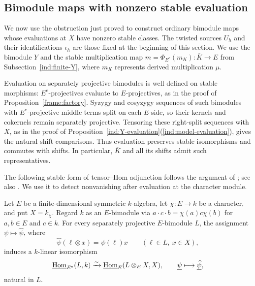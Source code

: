 \documentclass[11pt]{article}
\begin{document}
\subsection{Bimodule maps with nonzero stable evaluation}
\label{lift:nonzero-section}

We now use the obstruction just proved to construct ordinary bimodule maps
whose evaluations at $X$ have nonzero stable classes. The twisted
sources $U_h$ and their identifications $\iota_h$ are those fixed
at the beginning of this section.
We use the bimodule $Y$ and the stable multiplication map
$m=\Phi_{E^e}(m_K):\overline K\to E$ from
Subsection~\ref{ind:finite-Y}, where $m_K$ represents derived
multiplication $\mu$.

Evaluation on separately projective bimodules is well defined
on stable morphisms: $E^e$-projectives evaluate to $E$-projectives,
as in the proof of Proposition~\ref{frame:factory}.
Syzygy and cosyzygy sequences of such bimodules with
$E^e$-projective middle terms split on each $E$-side, so their kernels and cokernels remain
separately projective. Tensoring these right-split sequences with
$X$, as in the proof of Proposition~\ref{ind:Y-evaluation}\textup{(\ref{ind:model-evaluation})},
gives the natural shift comparisons. Thus evaluation preserves
stable isomorphisms and commutes with shifts. In particular,
$\overline K$ and all its shifts admit such representatives.

The following stable form of tensor--Hom adjunction follows the argument of
\cite[Lemma~6.6]{O}; see also \cite[(21)]{F}. We use it to detect
nonvanishing after evaluation at the character module.

\begin{Lem}\label{lift:stable-adjunction}
Let $E$ be a finite-dimensional symmetric $k$-algebra, let
$\chi:E\to k$ be a character, and put $X=k_\chi$.
Regard $k$ as an $E$-bimodule via
$a\cdot c\cdot b=\chi(a)c\chi(b)$ for $a,b\in E$ and $c\in k$.
For every separately projective $E$-bimodule $L$, the assignment
$\psi\mapsto\widehat\psi$, where
\[
 \widehat\psi(\ell\otimes x)=\psi(\ell)x
 \qquad(\ell\in L,\ x\in X),
\]
induces a $k$-linear isomorphism
\[
 \underline{{\rm Hom}}_{E^e}(L,k)
 \xrightarrow{\sim}\underline{{\rm Hom}}_E(L\otimes_E X,X),
 \qquad \underline\psi\longmapsto\underline{\widehat\psi},
\]
natural in $L$.
\end{Lem}
\end{document}
